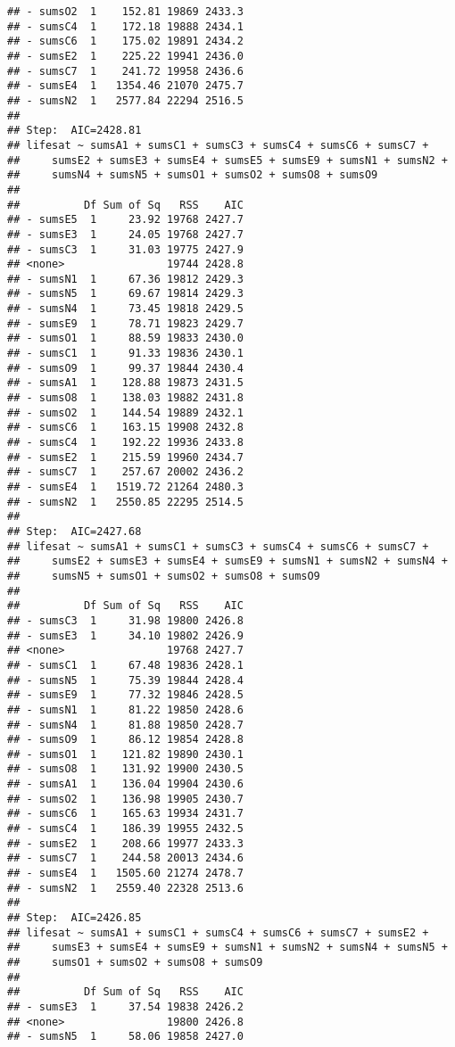 \documentclass[,man,floatsintext]{apa6}
\begin{document}
\begin{verbatim}
## - sumsO2  1    152.81 19869 2433.3
## - sumsC4  1    172.18 19888 2434.1
## - sumsC6  1    175.02 19891 2434.2
## - sumsE2  1    225.22 19941 2436.0
## - sumsC7  1    241.72 19958 2436.6
## - sumsE4  1   1354.46 21070 2475.7
## - sumsN2  1   2577.84 22294 2516.5
## 
## Step:  AIC=2428.81
## lifesat ~ sumsA1 + sumsC1 + sumsC3 + sumsC4 + sumsC6 + sumsC7 + 
##     sumsE2 + sumsE3 + sumsE4 + sumsE5 + sumsE9 + sumsN1 + sumsN2 + 
##     sumsN4 + sumsN5 + sumsO1 + sumsO2 + sumsO8 + sumsO9
## 
##          Df Sum of Sq   RSS    AIC
## - sumsE5  1     23.92 19768 2427.7
## - sumsE3  1     24.05 19768 2427.7
## - sumsC3  1     31.03 19775 2427.9
## <none>                19744 2428.8
## - sumsN1  1     67.36 19812 2429.3
## - sumsN5  1     69.67 19814 2429.3
## - sumsN4  1     73.45 19818 2429.5
## - sumsE9  1     78.71 19823 2429.7
## - sumsO1  1     88.59 19833 2430.0
## - sumsC1  1     91.33 19836 2430.1
## - sumsO9  1     99.37 19844 2430.4
## - sumsA1  1    128.88 19873 2431.5
## - sumsO8  1    138.03 19882 2431.8
## - sumsO2  1    144.54 19889 2432.1
## - sumsC6  1    163.15 19908 2432.8
## - sumsC4  1    192.22 19936 2433.8
## - sumsE2  1    215.59 19960 2434.7
## - sumsC7  1    257.67 20002 2436.2
## - sumsE4  1   1519.72 21264 2480.3
## - sumsN2  1   2550.85 22295 2514.5
## 
## Step:  AIC=2427.68
## lifesat ~ sumsA1 + sumsC1 + sumsC3 + sumsC4 + sumsC6 + sumsC7 + 
##     sumsE2 + sumsE3 + sumsE4 + sumsE9 + sumsN1 + sumsN2 + sumsN4 + 
##     sumsN5 + sumsO1 + sumsO2 + sumsO8 + sumsO9
## 
##          Df Sum of Sq   RSS    AIC
## - sumsC3  1     31.98 19800 2426.8
## - sumsE3  1     34.10 19802 2426.9
## <none>                19768 2427.7
## - sumsC1  1     67.48 19836 2428.1
## - sumsN5  1     75.39 19844 2428.4
## - sumsE9  1     77.32 19846 2428.5
## - sumsN1  1     81.22 19850 2428.6
## - sumsN4  1     81.88 19850 2428.7
## - sumsO9  1     86.12 19854 2428.8
## - sumsO1  1    121.82 19890 2430.1
## - sumsO8  1    131.92 19900 2430.5
## - sumsA1  1    136.04 19904 2430.6
## - sumsO2  1    136.98 19905 2430.7
## - sumsC6  1    165.63 19934 2431.7
## - sumsC4  1    186.39 19955 2432.5
## - sumsE2  1    208.66 19977 2433.3
## - sumsC7  1    244.58 20013 2434.6
## - sumsE4  1   1505.60 21274 2478.7
## - sumsN2  1   2559.40 22328 2513.6
## 
## Step:  AIC=2426.85
## lifesat ~ sumsA1 + sumsC1 + sumsC4 + sumsC6 + sumsC7 + sumsE2 + 
##     sumsE3 + sumsE4 + sumsE9 + sumsN1 + sumsN2 + sumsN4 + sumsN5 + 
##     sumsO1 + sumsO2 + sumsO8 + sumsO9
## 
##          Df Sum of Sq   RSS    AIC
## - sumsE3  1     37.54 19838 2426.2
## <none>                19800 2426.8
## - sumsN5  1     58.06 19858 2427.0

\end{verbatim}
\end{document}
